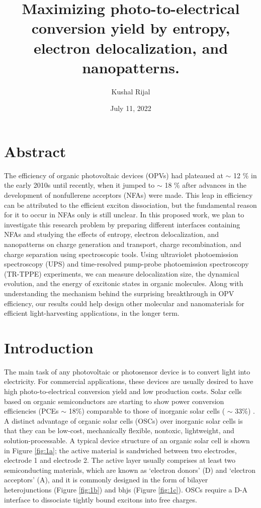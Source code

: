 \documentclass[12pt]{article}
\title{Maximizing photo-to-electrical conversion yield by entropy, electron delocalization, and nanopatterns.}
\author{Kushal Rijal}
\date{July 11, 2022}
\begin{document}
\maketitle
\section*{\hfil Abstract\hfil}
The efficiency of organic photovoltaic devices (OPVs) had plateaued at $\sim$ 12 \% in the early 2010s until recently, when it jumped to $\sim$ 18 \% after advances in the development of nonfullerene acceptors (NFAs) were made. This leap in efficiency can be attributed to the efficient exciton dissociation, but the fundamental reason for it to occur in NFAs only is still unclear. In this proposed work, we plan to investigate this research problem by preparing different interfaces containing NFAs and studying the effects of entropy, electron delocalization, and nanopatterns on charge generation and transport, charge recombination, and charge separation using spectroscopic tools. Using ultraviolet photoemission spectroscopy (UPS) and time-resolved pump-probe photoemission spectroscopy (TR-TPPE) experiments, we can measure delocalization size, the dynamical evolution, and the energy of excitonic states in organic molecules. Along with understanding the mechanism behind the surprising breakthrough in OPV efficiency, our results could help design other molecular and nanomaterials for efficient light-harvesting applications, in the longer term. 

\section{Introduction}
The main task of any photovoltaic or photosensor device is to convert light into electricity. For commercial applications, these devices are usually desired to have high photo-to-electrical conversion yield and low production costs. Solar cells based on organic semiconductors are starting to show power conversion efficiencies (PCEs $\sim$ 18$\%$) comparable to those of inorganic solar cells ( $\sim$ 33$\%$) \cite{hou2018organic,cariou2018iii}. A distinct advantage of organic solar cells (OSCs) over inorganic solar cells is that they can be low-cost, mechanically flexible, nontoxic, lightweight, and solution-processable. A typical device structure of an organic solar cell is shown in Figure \ref{fig:1a}; the active material is sandwiched between two electrodes, electrode 1 and electrode 2. The active layer usually comprises at least two semiconducting materials, which are known as \lq{electron donors}' (D) and \lq{electron acceptors}' (A), and it is commonly designed in the form of bilayer heterojunctions (Figure \ref{fig:1b}) and \acrfull{bhjs} (Figure \ref{fig:1c}). OSCs require a D-A interface to dissociate tightly bound excitons into free charges.
 
\end{document}
